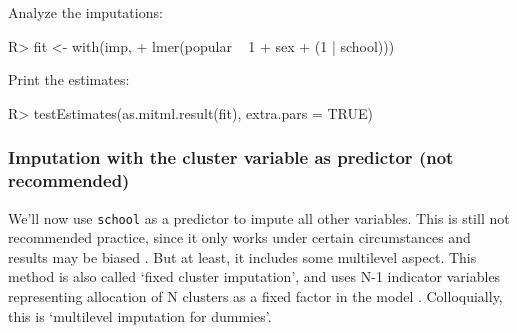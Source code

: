 \documentclass[
]{jss}
\begin{document}
Analyze the imputations:

\begin{CodeChunk}
\begin{CodeInput}
R> fit <- with(imp, 
+             lmer(popular ~ 1 + sex  + (1 | school))) 
\end{CodeInput}
\end{CodeChunk}

Print the estimates:

\begin{CodeChunk}
\begin{CodeInput}
R> testEstimates(as.mitml.result(fit), extra.pars = TRUE)
\end{CodeInput}
\end{CodeChunk}

\hypertarget{imputation-with-the-cluster-variable-as-predictor-not-recommended}{%
\subsubsection{Imputation with the cluster variable as predictor (not
recommended)}\label{imputation-with-the-cluster-variable-as-predictor-not-recommended}}

We'll now use \texttt{school} as a predictor to impute all other
variables. This is still not recommended practice, since it only works
under certain circumstances and results may be biased
\citep{drec15, ende16}. But at least, it includes some multilevel
aspect. This method is also called `fixed cluster imputation', and uses
N-1 indicator variables representing allocation of N clusters as a fixed
factor in the model \citep{reit06, ende16}. Colloquially, this is
`multilevel imputation for dummies'.
\end{document}

